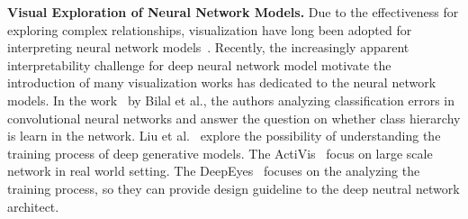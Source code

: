 \noindent\textbf{Visual Exploration of Neural Network Models.}
Due to the effectiveness for exploring complex relationships, visualization have long been adopted for interpreting neural network models~\cite{TzengMa2005}.
Recently, the increasingly apparent interpretability challenge for deep neural network model motivate the introduction of many visualization works has dedicated to the neural network models.
In the work~\cite{BilalJourablooYe2018} by Bilal et al., the authors analyzing classification errors in convolutional neural networks and answer the question on whether class hierarchy is learn in the network.
Liu et al.~\cite{LiuShiCao2018} explore the possibility of understanding the training process of deep generative models.
The ActiVis~\cite{KahngAndrewsKalro2018} focus on large scale network in real world setting.
The DeepEyes~\cite{Pezzotti2018} focuses on the analyzing the training process, so they can provide design guideline to the deep neutral network architect.


